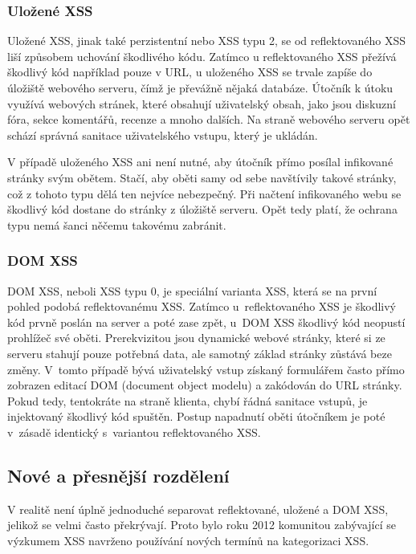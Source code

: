 \documentclass[11pt,conference, a4paper]{IEEEtran}
\begin{document}
\subsubsection{Uložené XSS}
Uložené XSS, jinak také perzistentní nebo XSS typu 2, se od reflektovaného XSS liší způsobem uchování škodlivého kódu. Zatímco u reflektovaného XSS přežívá škodlivý kód například pouze v URL, u uloženého XSS se trvale zapíše do úložiště webového serveru, čímž je převážně nějaká databáze. Útočník k útoku využívá webových stránek, které obsahují uživatelský obsah, jako jsou diskuzní fóra, sekce komentářů, recenze a mnoho dalších. Na straně webového serveru opět schází správná sanitace uživatelského vstupu, který je ukládán. 

V případě uloženého XSS ani není nutné, aby útočník přímo posílal infikované stránky svým obětem. Stačí, aby oběti samy od sebe navštívily takové stránky, což z tohoto typu dělá ten nejvíce nebezpečný. Při načtení infikovaného webu se škodlivý kód dostane do stránky z úložiště serveru. Opět tedy platí, že ochrana typu  nemá šanci něčemu takovému zabránit.~\cite{XSS-owasp}

\subsubsection{DOM XSS}
DOM XSS, neboli XSS typu 0, je speciální varianta XSS, která se na první pohled podobá reflektovanému XSS. Zatímco u~reflektovaného XSS je škodlivý kód prvně poslán na server a poté zase zpět, u~DOM XSS škodlivý kód neopustí prohlížeč své oběti. Prerekvizitou jsou dynamické webové stránky, které si ze serveru stahují pouze potřebná data, ale samotný základ stránky zůstává beze změny. V~tomto případě bývá uživatelský vstup získaný formulářem často přímo zobrazen editací DOM (document object modelu) a zakódován do URL stránky. Pokud tedy, tentokráte na straně klienta, chybí řádná sanitace vstupů, je injektovaný škodlivý kód spuštěn. Postup napadnutí oběti útočníkem je poté v~zásadě identický s~variantou reflektovaného XSS.~\cite{DOM-XSS-owasp}

\subsection{Nové a přesnější rozdělení}
V realitě není úplně jednoduché separovat reflektované, uložené a DOM XSS, jelikož se velmi často překrývají. Proto bylo roku 2012 komunitou zabývající se výzkumem XSS navrženo používání nových termínů na kategorizaci XSS.
\end{document}
